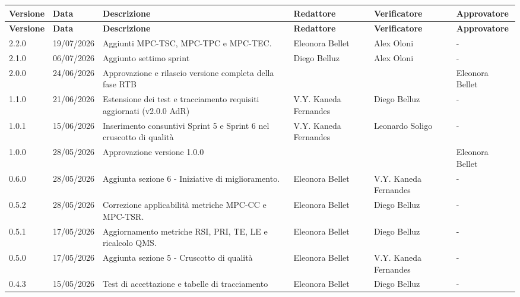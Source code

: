 \documentclass[a4paper,12pt]{article}
\begin{document}
\renewcommand{\arraystretch}{1.35}
\begin{center}
    {\footnotesize
    \begin{longtable}{|p{1.4cm}|p{1.8cm}|p{5cm}|p{2.4cm}|p{2.3cm}|p{2.3cm}|}
        \hline
        \rowcolor{gray!20}
        \textbf{Versione} & \textbf{Data} & \textbf{Descrizione} & \textbf{Redattore} & \textbf{Verificatore} & \textbf{Approvatore} \\
        \hline
        \endfirsthead
        \hline
        \rowcolor{gray!20}
        \textbf{Versione} & \textbf{Data} & \textbf{Descrizione} & \textbf{Redattore} & \textbf{Verificatore} & \textbf{Approvatore} \\
        \hline
        \endhead

        \hline
        2.2.0 & 19/07/2026 & Aggiunti MPC-TSC, MPC-TPC e MPC-TEC.  & Eleonora Bellet & Alex Oloni & - \\
        \hline
        2.1.0 & 06/07/2026 & Aggiunto settimo sprint & Diego Belluz & Alex Oloni & - \\
        \hline 
        2.0.0 & 24/06/2026 & Approvazione e rilascio versione completa della fase RTB &  &  & Eleonora Bellet \\
        \hline
        1.1.0 & 21/06/2026 & Estensione dei test e tracciamento requisiti aggiornati (v2.0.0 AdR) & V.Y. Kaneda Fernandes & Diego Belluz & - \\
        \hline
        1.0.1 & 15/06/2026 & Inserimento consuntivi Sprint 5 e Sprint 6 nel cruscotto di qualità & V.Y. Kaneda Fernandes & Leonardo Soligo & - \\
        \hline
        1.0.0 & 28/05/2026 & Approvazione versione 1.0.0 &  &  & Eleonora Bellet \\
        \hline
        0.6.0 & 28/05/2026 & Aggiunta sezione 6 - Iniziative di miglioramento. & Eleonora Bellet & V.Y. Kaneda Fernandes & - \\
        \hline
        0.5.2 & 28/05/2026 & Correzione applicabilità metriche MPC-CC e MPC-TSR. & Eleonora Bellet & Diego Belluz & - \\
        \hline
        0.5.1 & 17/05/2026 & Aggiornamento metriche RSI, PRI, TE, LE e ricalcolo QMS. & Eleonora Bellet & Diego Belluz & - \\
        \hline
        0.5.0 & 17/05/2026 & Aggiunta sezione 5 - Cruscotto di qualità & Eleonora Bellet & V.Y. Kaneda Fernandes & - \\
        \hline
        0.4.3 & 15/05/2026 & Test di accettazione e tabelle di tracciamento & Eleonora Bellet & Diego Belluz & - \\

\end{longtable}}
\end{center}
\end{document}
